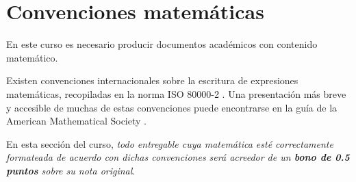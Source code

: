\section{Convenciones matemáticas}
En este curso es necesario producir documentos académicos con contenido matemático.

Existen convenciones internacionales sobre la escritura de expresiones matemáticas, recopiladas en la norma ISO 80000-2 \cite{iso800002}. Una presentación más breve y accesible de muchas de estas convenciones puede encontrarse en la guía de la American Mathematical Society \cite{ams2017shortmath}. 
 
En esta sección del curso, \emph{todo entregable cuya matemática esté correctamente formateada de acuerdo con dichas convenciones será acreedor de un \textbf{bono de 0.5 puntos} sobre su nota original}.
